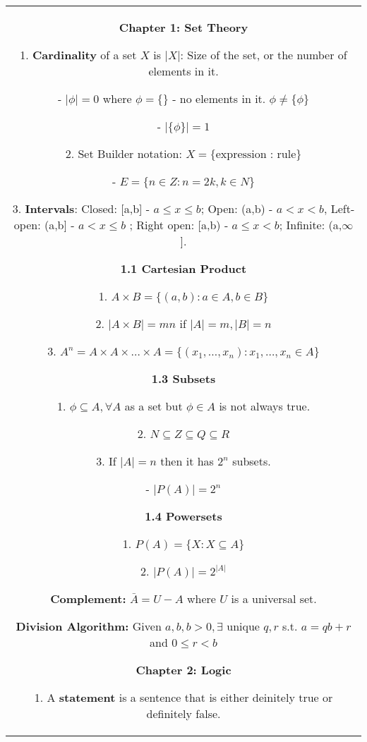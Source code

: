\documentclass[a4paper]{article}
\begin{document}
    \pagestyle{empty}%
    \noindent
    \begin{tabular}{@{}c@{}}
    \begin{minipage}[t][\paperheight][t]{0.5\paperwidth}%
        \textbf{Chapter 1: Set Theory}

        1. \textbf{Cardinality} of a set $X$ is $|X|$: Size of the set, or the number of elements in it.
        
        \quad - $|\phi| = 0$ where $\phi = \{\}$ - no elements in it. $\phi \ne \{\phi\}$
          
        \quad- $|\{\phi\}| = 1$

        2. Set Builder notation: $X = \{\text{expression : rule}\}$

        \quad -  $E = \{n \in Z: n = 2k, k \in N\}$ 
        
        3. \textbf{Intervals}: Closed: [a,b] - $a \le x \le b$; Open: (a,b) -  $a < x < b$, Left-open: (a,b] -  $a < x \le b$ ; Right open: [a,b) - $a \le x < b$; Infinite: (a,$\infty$].
        
        \textbf{1.1 Cartesian Product}

        1. $A \times  B = \{(a,b): a\in A, b \in B\}$ 
        
        2. $| A \times  B | = mn$ if $|A| = m, |B| = n$

        3.  $A^n = A \times A \times \dots \times  A = \{(x_1,\dots,x_n): x_1,\dots,x_n \in A\}$ 
        
        \textbf{1.3 Subsets}

        1. $\phi \subseteq A, \forall A$ as a set but $\phi \in A$ is not always true.

        2.  $N \subseteq Z \subseteq Q \subseteq R$

        3.  If $|A| = n$ then it has $2^{n}$ subsets.
        
        \quad  - $|P(A)| = 2^n$

        
        \textbf{1.4 Powersets}

        1. $P(A) = \{X: X \subseteq A\}$

        2.  $|P(A)| = 2^{|A|}$

        \textbf{Complement:} $\bar A = U - A$ where  $U$ is a universal set.

        \textbf{Division Algorithm:} Given $a,b, b > 0, \exists $ unique  $q,r$ s.t.  $a = qb + r$ and  $ 0 \le r < b$


        \textbf{Chapter 2: Logic}
        
        1. A \textbf{statement} is a sentence that is either deinitely true or definitely false.
        

\end{minipage}
\end{tabular}
\end{document}
